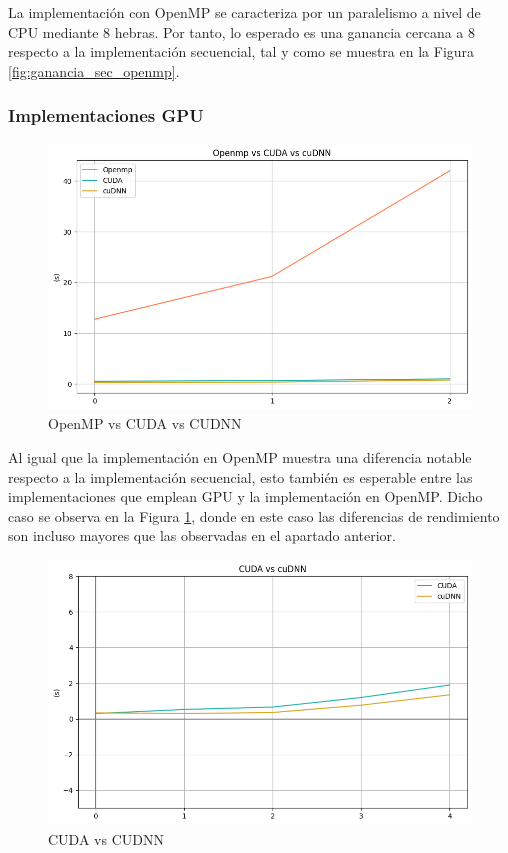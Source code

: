 La implementación con OpenMP se caracteriza por un paralelismo a nivel de CPU mediante 8 hebras. Por tanto, lo esperado es una ganancia cercana a 8 respecto a la implementación secuencial, tal y como se muestra en la Figura \ref{fig:ganancia_sec_openmp}.

\subsubsection{Implementaciones GPU}

\begin{figure}[H]
	\centering
	\includegraphics[scale=0.5]{imagenes/openmp_cuda_cudnn.png}  
	\caption{OpenMP vs CUDA vs CUDNN}
	\label{fig:openmp_cuda_cudnn}
\end{figure}

Al igual que la implementación en OpenMP muestra una diferencia notable respecto a la implementación secuencial, esto también es esperable entre las implementaciones que emplean GPU y la implementación en OpenMP. Dicho caso se observa en la Figura \ref{fig:openmp_cuda_cudnn}, donde en este caso las diferencias de rendimiento son incluso mayores que las observadas en el apartado anterior.

\begin{figure}[H]
	\centering
	\includegraphics[scale=0.5]{imagenes/cuda_cudnn_1.png}  
	\caption{CUDA vs CUDNN}
	\label{fig:cuda_cudnn_1}
\end{figure}

